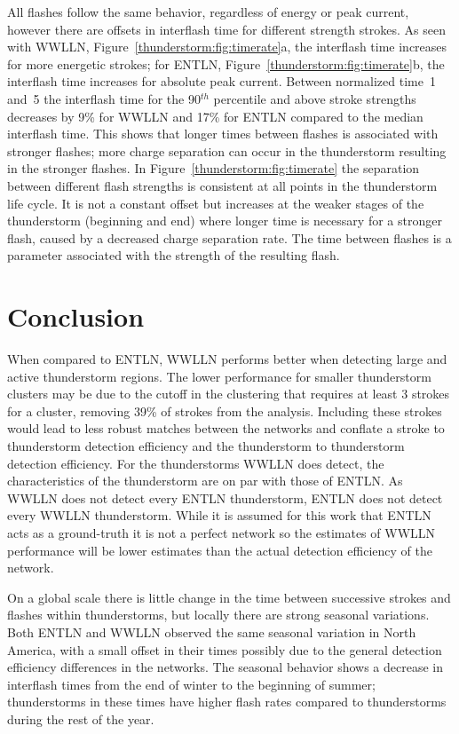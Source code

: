 All flashes follow the same behavior, regardless of energy or peak current, however there are offsets in interflash time for different strength strokes.
As seen with WWLLN, Figure~\ref{thunderstorm:fig:timerate}a, the interflash time increases for more energetic strokes; for ENTLN, Figure~\ref{thunderstorm:fig:timerate}b, the interflash time increases for absolute peak current.
Between normalized time~1 and~5 the interflash time for the 90$^{th}$ percentile and above stroke strengths decreases by 9\% for WWLLN and 17\% for ENTLN compared to the median interflash time.
This shows that longer times between flashes is associated with stronger flashes; more charge separation can occur in the thunderstorm resulting in the stronger flashes.
In Figure~\ref{thunderstorm:fig:timerate} the separation between different flash strengths is consistent at all points in the thunderstorm life cycle.
It is not a constant offset but increases at the weaker stages of the thunderstorm (beginning and end) where longer time is necessary for a stronger flash, caused by a decreased charge separation rate.
The time between flashes is a parameter associated with the strength of the resulting flash.

\section{Conclusion}


When compared to ENTLN, WWLLN performs better when detecting large and active thunderstorm regions.
The lower performance for smaller thunderstorm clusters may be due to the cutoff in the clustering that requires at least 3 strokes for a cluster, removing 39\% of strokes from the analysis.
Including these strokes would lead to less robust matches between the networks and conflate a stroke to thunderstorm detection efficiency and the thunderstorm to thunderstorm detection efficiency.
For the thunderstorms WWLLN does detect, the characteristics of the thunderstorm are on par with those of ENTLN.
As WWLLN does not detect every ENTLN thunderstorm, ENTLN does not detect every WWLLN thunderstorm.
While it is assumed for this work that ENTLN acts as a ground-truth it is not a perfect network so the estimates of WWLLN performance will be lower estimates than the actual detection efficiency of the network.


On a global scale there is little change in the time between successive strokes and flashes within thunderstorms, but locally there are strong seasonal variations.
Both ENTLN and WWLLN observed the same seasonal variation in North America, with a small offset in their times possibly due to the general detection efficiency differences in the networks.
The seasonal behavior shows a decrease in interflash times from the end of winter to the beginning of summer; thunderstorms in these times have higher flash rates compared to thunderstorms during the rest of the year.

